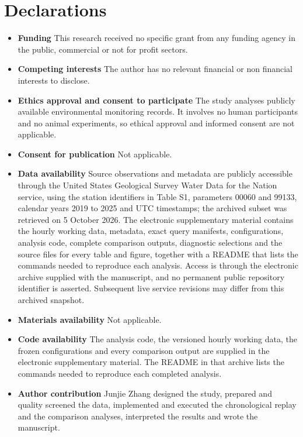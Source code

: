 \documentclass[pdflatex,sn-mathphys-num]{sn-jnl}%
\theoremstyle{thmstyleone}%
\theoremstyle{thmstyletwo}%
\theoremstyle{thmstylethree}%
\begin{document}
\section*{Declarations}

\begin{itemize}
\item \textbf{Funding} This research received no specific grant from any funding agency in the public, commercial or not for profit sectors.
\item \textbf{Competing interests} The author has no relevant financial or non financial interests to disclose.
\item \textbf{Ethics approval and consent to participate} The study analyses publicly available environmental monitoring records. It involves no human participants and no animal experiments, so ethical approval and informed consent are not applicable.
\item \textbf{Consent for publication} Not applicable.
\item \textbf{Data availability} Source observations and metadata are publicly accessible through the United States Geological Survey Water Data for the Nation service, using the station identifiers in Table S1, parameters 00060 and 99133, calendar years 2019 to 2025 and UTC timestamps; the archived subset was retrieved on 5 October 2026. The electronic supplementary material contains the hourly working data, metadata, exact query manifests, configurations, analysis code, complete comparison outputs, diagnostic selections and the source files for every table and figure, together with a README that lists the commands needed to reproduce each analysis. Access is through the electronic archive supplied with the manuscript, and no permanent public repository identifier is asserted. Subsequent live service revisions may differ from this archived snapshot.
\item \textbf{Materials availability} Not applicable.
\item \textbf{Code availability} The analysis code, the versioned hourly working data, the frozen configurations and every comparison output are supplied in the electronic supplementary material. The README in that archive lists the commands needed to reproduce each completed analysis.
\item \textbf{Author contribution} Junjie Zhang designed the study, prepared and quality screened the data, implemented and executed the chronological replay and the comparison analyses, interpreted the results and wrote the manuscript.

\end{itemize}
\end{document}
